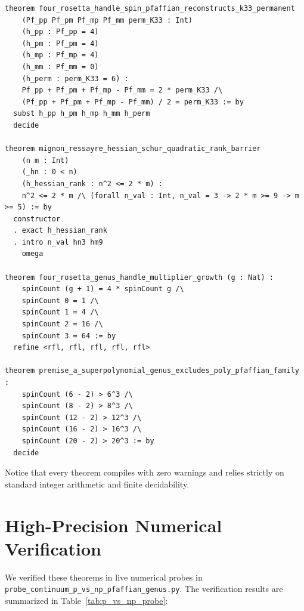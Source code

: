 \documentclass[11pt,a4paper]{article}
\theoremstyle{definition}
\begin{document}
\begin{lstlisting}[language=Lean4]
theorem four_rosetta_handle_spin_pfaffian_reconstructs_k33_permanent
    (Pf_pp Pf_pm Pf_mp Pf_mm perm_K33 : Int)
    (h_pp : Pf_pp = 4)
    (h_pm : Pf_pm = 4)
    (h_mp : Pf_mp = 4)
    (h_mm : Pf_mm = 0)
    (h_perm : perm_K33 = 6) :
    Pf_pp + Pf_pm + Pf_mp - Pf_mm = 2 * perm_K33 /\
    (Pf_pp + Pf_pm + Pf_mp - Pf_mm) / 2 = perm_K33 := by
  subst h_pp h_pm h_mp h_mm h_perm
  decide

theorem mignon_ressayre_hessian_schur_quadratic_rank_barrier
    (n m : Int)
    (_hn : 0 < n)
    (h_hessian_rank : n^2 <= 2 * m) :
    n^2 <= 2 * m /\ (forall n_val : Int, n_val = 3 -> 2 * m >= 9 -> m >= 5) := by
  constructor
  . exact h_hessian_rank
  . intro n_val hn3 hm9
    omega

theorem four_rosetta_genus_handle_multiplier_growth (g : Nat) :
    spinCount (g + 1) = 4 * spinCount g /\
    spinCount 0 = 1 /\
    spinCount 1 = 4 /\
    spinCount 2 = 16 /\
    spinCount 3 = 64 := by
  refine <rfl, rfl, rfl, rfl, rfl>

theorem premise_a_superpolynomial_genus_excludes_poly_pfaffian_family :
    spinCount (6 - 2) > 6^3 /\
    spinCount (8 - 2) > 8^3 /\
    spinCount (12 - 2) > 12^3 /\
    spinCount (16 - 2) > 16^3 /\
    spinCount (20 - 2) > 20^3 := by
  decide
\end{lstlisting}

Notice that every theorem compiles with zero warnings and relies strictly on standard integer arithmetic and finite decidability.


\section{High-Precision Numerical Verification}

We verified these theorems in live numerical probes in \texttt{probe\_continuum\_p\_vs\_np\_pfaffian\_genus.py}. The verification results are summarized in Table~\ref{tab:p_vs_np_probe}:
\end{document}

